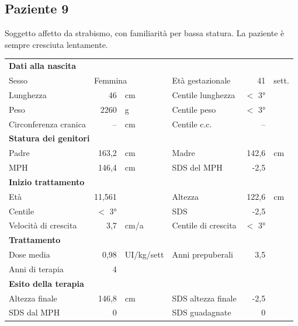 \subsection*{Paziente 9}%


Soggetto affetto da strabismo, con familiarità per bassa statura. La paziente è sempre cresciuta lentamente.


\begin{table}[!h]
\begin{tabular}{lrllrl}
\toprule
\multicolumn{6}{l}{\textbf{Dati alla nascita}}\\
Sesso 		& \multicolumn{2}{l}{Femmina} 	& Età gestazionale 		& 41 		& sett.\\
Lunghezza 	& 46 		& cm 				& Centile lunghezza		& $<$ 3° 		\\
Peso 		& 2260 		& g					& Centile peso			& $<$ 3° 		\\
Circonferenza cranica	& -- 		& cm 	& Centile c.c.			& -- \\
\midrule
\multicolumn{6}{l}{\textbf{Statura dei genitori}}\\
Padre 		& 163,2 & cm 	& Madre 				& 142,6 & cm \\
MPH 		& 146,4 & cm 	& SDS del MPH 			& -2,5\\
\midrule
\multicolumn{6}{l}{\textbf{Inizio trattamento}} \\
Età	& 11,561 & 		& Altezza 				& 122,6 & cm  \\
Centile & $<$ 3° 	 &		& SDS		& -2,5 \\
Velocità di crescita & 3,7 & cm/a	& Centile di crescita & $<$ 3°\\
\midrule
\multicolumn{6}{l}{\textbf{Trattamento}} \\
Dose media		& 0,98 & UI/kg/sett & Anni prepuberali & 3,5\\
Anni di terapia & 4\\
\midrule
\multicolumn{6}{l}{\textbf{Esito della terapia}} \\
Altezza finale			& 146,8 & cm 	& SDS altezza finale		& -2,5\\
SDS dal MPH				& 0 &		& SDS guadagnate 			& 0\\
\bottomrule
\end{tabular}
\end{table}
\clearpage


